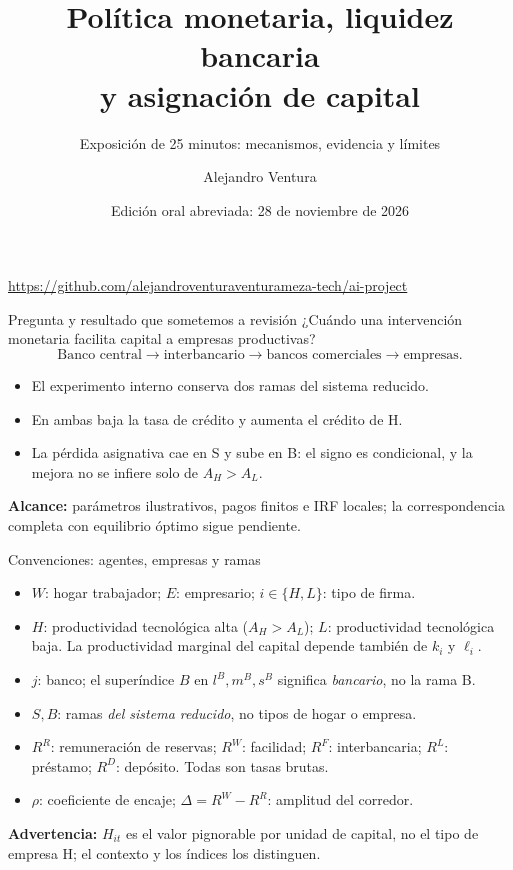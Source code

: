 \documentclass[aspectratio=169,11pt]{beamer}
\title{Política monetaria, liquidez bancaria\\y asignación de capital}
\subtitle{Exposición de 25 minutos: mecanismos, evidencia y límites}
\author{Alejandro Ventura}
\date{Edición oral abreviada: 28 de noviembre de 2026}
\begin{document}
\begin{frame}[plain]\titlepage
\centering\footnotesize
\url{https://github.com/alejandroventuraventurameza-tech/ai-project}
\end{frame}

\begin{frame}{Pregunta y resultado que sometemos a revisión}
¿Cuándo una intervención monetaria facilita capital a empresas productivas?
\medskip
\[
\text{Banco central}\longrightarrow\text{interbancario}\longrightarrow
\text{bancos comerciales}\longrightarrow\text{empresas}.
\]
\begin{itemize}
\item El experimento interno conserva dos ramas del sistema reducido.
\item En ambas baja la tasa de crédito y aumenta el crédito de H.
\item La pérdida asignativa cae en S y sube en B: el signo es condicional, y la mejora no se infiere solo de $A_H>A_L$.
\end{itemize}
\medskip
\textbf{Alcance:} parámetros ilustrativos, pagos finitos e IRF locales;
la correspondencia completa con equilibrio óptimo sigue pendiente.
\end{frame}

\begin{frame}{Convenciones: agentes, empresas y ramas}
\small
\begin{itemize}
\item $W$: hogar trabajador; $E$: empresario; $i\in\{H,L\}$: tipo de firma.
\item $H$: productividad tecnológica alta ($A_H>A_L$); $L$: productividad tecnológica baja. La productividad marginal del capital depende también de $k_i$ y $\ell_i$.
\item $j$: banco; el superíndice $B$ en $l^B,m^B,s^B$ significa \emph{bancario}, no la rama B.
\item $S,B$: ramas \emph{del sistema reducido}, no tipos de hogar o empresa.
\item $R^R$: remuneración de reservas; $R^W$: facilidad; $R^F$: interbancaria; $R^L$: préstamo; $R^D$: depósito. Todas son tasas brutas.
\item $\rho$: coeficiente de encaje; $\Delta=R^W-R^R$: amplitud del corredor.
\end{itemize}
\medskip
\textbf{Advertencia:} $H_{it}$ es el valor pignorable por unidad de capital, no el tipo de empresa H; el contexto y los índices los distinguen.
\end{frame}
\end{document}
